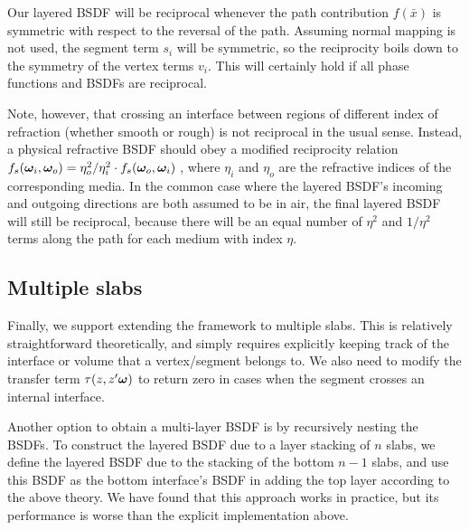 Our layered BSDF will be reciprocal whenever the path contribution $f(\bar x)$ is symmetric with respect to the reversal of the path. Assuming normal mapping is not used, the segment term $s_i$ will be symmetric, so the reciprocity boils down to the symmetry of the vertex terms $v_i$. This will certainly hold if all phase functions and BSDFs are reciprocal.

Note, however, that crossing an interface between regions of different index of refraction (whether smooth or rough) is not reciprocal in the usual sense. Instead, a physical refractive BSDF should obey a modified reciprocity relation $f_s(\bm{\omega}_i, \bm{\omega}_o) = \eta_o^2 / \eta_i^2 \cdot f_s(\bm{\omega}_o, \bm{\omega}_i)$ \cite{walter2007microfacet}, where $\eta_i$ and $\eta_o$ are the refractive indices of the corresponding media. In the common case where the layered BSDF's incoming and outgoing directions are both assumed to be in air, the final layered BSDF will still be reciprocal, because there will be an equal number of $\eta^2$ and $1/\eta^2$ terms along the path for each medium with index $\eta$.


\subsection{Multiple slabs}
\label{subsec:multi_layer}

Finally, we support extending the framework to multiple slabs. This is relatively straightforward theoretically, and simply requires explicitly keeping track of the interface or volume that a vertex/segment belongs to. We also need to modify the transfer term $\tau(z,z'\bm{\omega})$ to return zero in cases when the segment crosses an internal interface.

Another option to obtain a multi-layer BSDF is by recursively nesting the BSDFs. To construct the layered BSDF due to a layer stacking of $n$ slabs, we define the layered BSDF due to the stacking of the bottom $n-1$ slabs, and use this BSDF as the bottom interface's BSDF in adding the top layer according to the above theory. We have found that this approach works in practice, but its performance is worse than the explicit implementation above.


